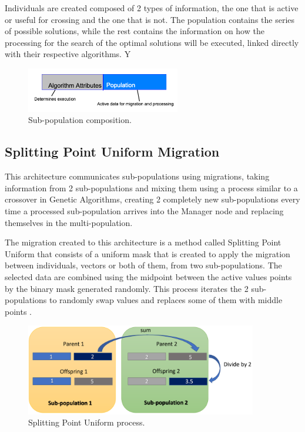 \documentclass[runningheads]{llncs}
\begin{document}
Individuals are created composed of 2 types of information, the one that is
active or useful for crossing and the one that is not. %
The population contains
the series of possible solutions, while the rest %
contains the information on how
the processing for the search of the optimal solutions will be executed, linked
directly with their respective algorithms.
Y
\begin{figure}[htp]
  \centering
  \includegraphics[width=0.6\textwidth]{img/subpopulationDefinition.png}
  \caption{Sub-population composition.} \label{fig3}
  \end{figure}

\subsection{Splitting Point Uniform Migration}

This architecture communicates sub-populations using migrations,
taking
information from 2 sub-populations and mixing them using a process similar to a
crossover in Genetic Algorithms, creating 2 completely new sub-populations every
time a processed sub-population arrives into the Manager node and replacing
themselves in the multi-population.

The migration created to %
this architecture is a method called Splitting Point
Uniform that consists of a uniform mask that is created to apply the migration
between individuals, vectors or both of them, from two sub-populations. The
selected data are combined using the midpoint between the active values
points by the binary mask generated randomly. %
This process iterates the 2
sub-populations to randomly swap values and replaces some of them with middle
points \cite{Kramer2017,Kaya2011}.


\begin{figure}[htp]
  \centering
  \includegraphics[width=0.9\textwidth]{img/splittinPointUniform.png}
  \caption{Splitting Point Uniform process.} \label{fig4}
  \end{figure}
\end{document}
